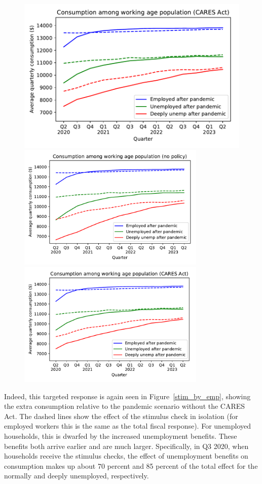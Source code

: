 \documentclass[titlepage]{\econtex}
\begin{document}
\begin{figure}
{    \includegraphics[width=0.8\webWidth\textwidth]{./Figures/ConRespByEmpStateWStim}
  } %
  { \includegraphics[width=0.8\textwidth]{./Figures/ConRespByEmpStateNoStim}
    \includegraphics[width=0.8\textwidth]{./Figures/ConRespByEmpStateWStim}}
\end{figure}

Indeed, this targeted response is again seen in Figure~\ref{stim_by_emp},
showing the extra consumption relative to the pandemic scenario without the CARES Act.
The dashed lines show the effect of the stimulus check in isolation (for employed workers this is the same as the total fiscal response).
For unemployed households, this is dwarfed by the increased unemployment benefits.
These benefits both arrive earlier and are much larger.
Specifically, in Q3 2020, when households receive the stimulus checks, the effect of unemployment benefits on consumption makes up about 70 percent and 85 percent of the total effect for the normally and deeply unemployed, respectively.
\end{document}
